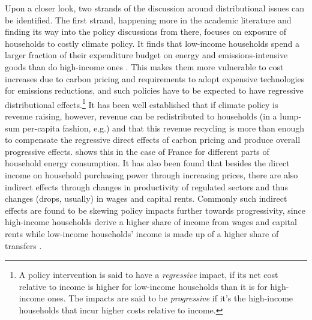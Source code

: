 \documentclass[a4paper,11pt,abstract=true]{scrartcl}
\begin{document}
Upon a closer look, two strands of the discussion around distributional issues can be identified.
The first strand, happening more in the academic literature and finding its way into the policy discussions from there, focuses on exposure of households to costly climate policy.
It finds that low-income households spend a larger fraction of their expenditure budget on energy and emissions-intensive goods than do high-income ones \citep[][,e.g., focuses on transport fuels]{sterner_distributional_2012}.
This makes them more vulnerable to cost increases due to carbon pricing and requirements to adopt expensive technologies for emissions reductions, and such policies have to be expected to have regressive distributional effects.\footnote{%
  A policy intervention is said to have a \emph{regressive} impact, if its net cost relative to income is higher for low-income households than it is for high-income ones.
  The impacts are said to be \emph{progressive} if it's the high-income households that incur higher costs relative to income.
}
It has been well established that if climate policy is revenue raising, however, revenue can be redistributed to households (in a lump-sum per-capita fashion, e.g.) and that this revenue recycling is more than enough to compensate the regressive direct effects of carbon pricing and produce overall progressive effects.
\citet{berry_distributional_2019} shows this in the case of France for different parts of household energy consumption.
It has also been found that besides the direct income on household purchasing power through increasing prices, there are also indirect effects through changes in productivity of regulated sectors and thus changes (drops, usually) in wages and capital rents.
Commonly such indirect effects are found to be skewing policy impacts further towards progressivity, since high-income households derive a higher share of income from wages and capital rents while low-income households' income is made up of a higher share of transfers
\citep[see][for some examples]{rausch_distributional_2011, landis_efficient_2019, landis_between-_2021}.
\end{document}

